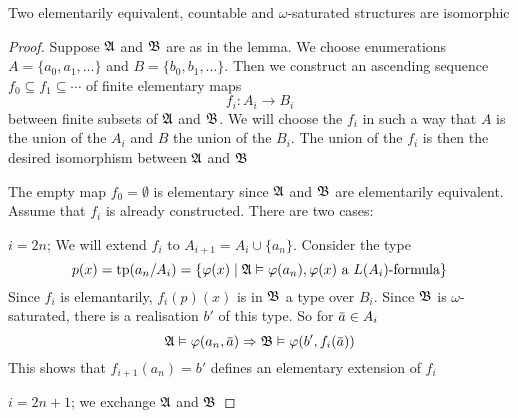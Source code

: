 \documentclass[11pt]{article}
\begin{document}
\begin{lemma}[]
\label{lemma4.3.3}
Two elementarily equivalent, countable and \(\omega\)-saturated structures
are isomorphic
\end{lemma}

\begin{proof}
Suppose \(\mathfrak{A}\) and \(\mathfrak{B}\) are as in the lemma. We choose enumerations
\(A=\{a_0,a_1,\dots\}\) and \(B=\{b_0,b_1,\dots\}\). Then we construct an
ascending sequence \(f_0\subseteq f_1\subseteq \cdots\) of finite elementary
maps
\begin{equation*}
f_i:A_i\to B_i
\end{equation*}
between finite subsets of \(\mathfrak{A}\) and \(\mathfrak{B}\). We will choose the \(f_i\) in
such a way that \(A\) is the union of the \(A_i\) and \(B\) the union of the
\(B_i\). The union of the \(f_i\) is then the desired isomorphism between
\(\mathfrak{A}\) and \(\mathfrak{B}\)

The empty map \(f_0=\emptyset\) is elementary since \(\mathfrak{A}\) and \(\mathfrak{B}\) are
elementarily equivalent. Assume that \(f_i\) is already constructed. There
are two cases:

\(i=2n\); We will extend \(f_i\) to \(A_{i+1}=A_i\cup\{a_n\}\). Consider the
type
\begin{equation*}
p(x)=\operatorname{tp}(a_n/A_i)=\{\varphi(x)\mid\mathfrak{A}\vDash\varphi(a_n), \varphi(x)\text{ a $L(A_i)$-formula}\}
\end{equation*}
Since \(f_i\) is elemantarily, \(f_i(p)(x)\) is in \(\mathfrak{B}\) a type over
\(B_i\). Since \(\mathfrak{B}\) is \(\omega\)-saturated, there is a realisation \(b'\)
of this type. So for \(\bbar{a}\in A_i\)
\begin{equation*}
\fA\vDash\varphi(a_n,\bbar{a}) \Rightarrow\fB\vDash\varphi(b',f_i(\bbar{a}))
\end{equation*}
This shows that \(f_{i+1}(a_n)=b'\) defines an elementary extension of
\(f_i\)

\(i=2n+1\); we exchange \(\mathfrak{A}\) and \(\mathfrak{B}\)
\end{proof}
\end{document}
